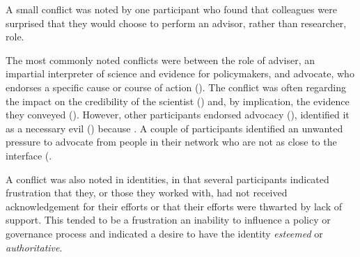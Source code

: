 A small conflict was noted by one participant who found that colleagues were surprised that they would choose to perform an advisor, rather than researcher, role.

The most commonly noted conflicts were between the role of adviser, an impartial interpreter of science and evidence for policymakers, and advocate, who endorses a specific cause or course of action (). The conflict was often regarding the impact on the credibility of the scientist () and, by implication, the evidence they conveyed (). However, other participants endorsed advocacy (), identified it as a necessary evil () because . A couple of participants identified an unwanted pressure to advocate from people in their network who are not as close to the interface (.

A conflict was also noted in identities, in that several participants indicated frustration that they, or those they worked with, had not received acknowledgement for their efforts or that their efforts were thwarted by lack of support. This tended to be a frustration an inability to influence a policy or governance process and indicated a desire to have the identity \emph{esteemed} or \emph{authoritative}.


